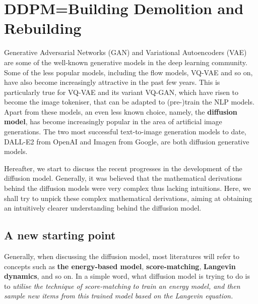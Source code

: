 \section{DDPM=Building Demolition and Rebuilding}

Generative Adversarial Networks (GAN) and Variational Autoencoders (VAE) are some of the well-known generative models in the deep learning community. Some of the less popular models, including the flow models\cite{lipman2022flow}, VQ-VAE\cite{razavi2019generating} and so on, have also become increasingly attractive in the past few years. This is particularly true for VQ-VAE and its variant VQ-GAN, which have risen to become the image tokeniser, that can be adapted to (pre-)train the NLP models. Apart from these models, an even less known choice, namely, the \textbf{diffusion model}, has become increasingly popular in the area of artificial image generations. The two most successful text-to-image generation models to date,  DALL-E2 from OpenAI and Imagen from Google, are both diffusion generative models.

Hereafter, we start to discuss the recent progresses in the development of the diffusion model. Generally, it was believed that the mathematical derivations behind the diffusion models were very complex thus lacking intuitions. Here, we shall try to unpick these complex mathematical derivations, aiming at obtaining an intuitively clearer understanding behind the diffusion model.

\subsection{A new starting point}

Generally, when discussing the diffusion model, most literatures will refer to concepts such as \textbf{the energy-based model}, \textbf{score-matching}, \textbf{Langevin dynamics}, and so on. In a simple word, what diffusion model is trying to do is to \emph{utilise the technique of score-matching to train an energy model, and then sample new items from this trained model based on the Langevin equation.}

